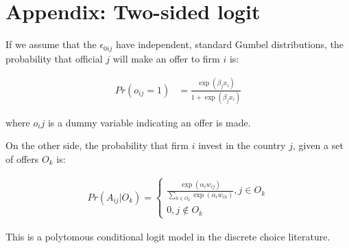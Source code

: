 \section{Appendix: Two-sided logit}

If we assume that the $\epsilon_{0ij}$ have independent, standard Gumbel distributions, the probability that official $j$ will make an offer to firm $i$ is:

\begin{align}
Pr(o_{ij} = 1) &= \frac{\exp(\beta_j x_i)}{1 + \exp(\beta_j x_i)}
\end{align}

where $o_ij$ is a dummy variable indicating an offer is made.

On the other side, the probability that firm $i$ invest in the country $j$, given a set of offers $O_k$ is:

\begin{align}
Pr(A_{ij} | O_k) =\begin{cases}
\frac{\exp(\alpha_i w_{ij})}{\displaystyle \sum_{h \in O_k} \exp(\alpha_i w_{ih})}, j \in O_k\\
0, j \notin O_k
\end{cases}
\end{align}

This is a polytomous conditional logit model in the discrete choice literature.